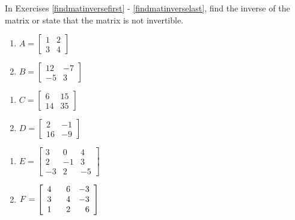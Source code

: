 \documentclass{ximera}
\begin{document}
	\author{Stitz-Zeager}


\label{ExercisesforMatMethods}

In Exercises \ref{findmatinversefirst} - \ref{findmatinverselast}, find the inverse of the matrix or state that the matrix is not invertible.

\begin{multicols}{2}
\begin{enumerate}

\item $A = \left[ \begin{array}{rr} 1 & 2 \\ 3 & 4 \end{array} \right]$ \label{findmatinversefirst}
\item $B = \left[ \begin{array}{rr} 12 & -7 \\ -5 & 3 \end{array} \right]$ \label{matrixB}

\setcounter{HW}{\value{enumi}}
\end{enumerate}
\end{multicols}

\begin{multicols}{2}
\begin{enumerate}
\setcounter{enumi}{\value{HW}}

\item $C = \left[ \begin{array}{rr} 6 & 15 \\ 14 & 35 \end{array} \right]$
\item $D = \left[ \begin{array}{rr} 2 & -1 \\ 16 & -9 \end{array} \right]$ \label{matrixD}

\setcounter{HW}{\value{enumi}}
\end{enumerate}
\end{multicols}

\begin{multicols}{2}
\begin{enumerate}
\setcounter{enumi}{\value{HW}}

\item $E = \left[ \begin{array}{rrr} 3 & 0 & 4 \\ 2 & -1 & 3 \\ -3 & 2 & -5 \end{array} \right]$ \label{matrixE}
\item $F = \left[ \begin{array}{rrr} 4 & \hphantom{-}6 & -3 \\ 3 & 4 & -3 \\ 1 & 2 & 6 \end{array} \right]$

\setcounter{HW}{\value{enumi}}
\end{enumerate}
\end{multicols}
\end{document}
